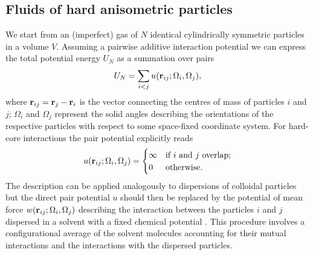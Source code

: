 {\subsection{Fluids of hard anisometric particles}
We start from an (imperfect) gas of $N$ identical cylindrically symmetric particles in a volume $V$.
Assuming a pairwise additive interaction potential we can express the total potential energy $U_{N}$  as a summation over pairs
\begin{equation}
U_{N}=\sum_{i<j} u({\bf r}_{ij}; \Omega_{i}, \Omega_{j}),
\end{equation}
where ${\bf r}_{ij}={\bf r} _{j}- {\bf r} _{i}$ is the vector connecting the centres of mass of particles $i$ and $j$;
$\Omega_{i}$ and $\Omega_{j}$ represent the solid angles describing the orientations of
the respective particles with respect to some space-fixed coordinate system.
For hard-core interactions the pair potential explicitly reads
\begin{equation}
u({\bf r}_{ij}; \Omega_{i}, \Omega_{j}) =
\begin{cases}
\infty  &\text{if $i$ and $j$ overlap;} \\
0 &\text{otherwise.} \label{0pairpot}
\end{cases}
\end{equation}
The  description can be applied analogously to dispersions of colloidal particles
 but the direct pair potential $u$
 should then be replaced by the potential of mean force $w({\bf r}_{ij};\Omega_{i},\Omega_{j})$ describing
the interaction between the  particles $i$ and $j$
dispersed in a  solvent with a fixed chemical potential \cite{macmillan,Hill}.
This procedure involves a configurational average of the solvent molecules accounting for
their mutual interactions and the interactions with the dispersed particles.

}
